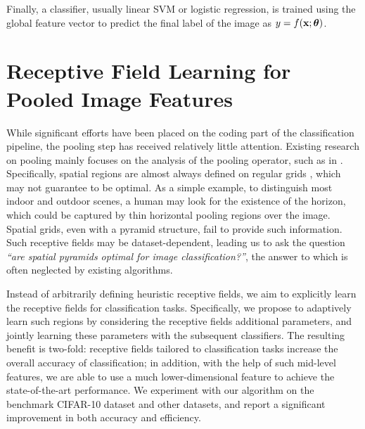 Finally, a classifier, usually linear SVM or logistic regression, is trained using the global feature vector to predict the final label of the image as $y = f(\mathbf{x};\boldsymbol{\theta})$.

\section{Receptive Field Learning for Pooled Image Features}\label{sec:grafting}
While significant efforts have been placed on the coding part of the classification pipeline, the pooling step has received relatively little attention. Existing research on pooling mainly focuses on the analysis of the pooling operator, such as in \cite{Boureau:2010wz}. Specifically, spatial regions are almost always defined on regular grids \cite{Yang:2009vb}, which may not guarantee to be optimal. As a simple example, to distinguish most indoor and outdoor scenes, a human may look for the existence of the horizon, which could be captured by thin horizontal pooling regions over the image. Spatial grids, even with a pyramid structure, fail to provide such information. Such receptive fields may be dataset-dependent, leading us to ask the question \emph{``are spatial pyramids optimal for image classification?''}, the answer to which is often neglected by existing algorithms.

Instead of arbitrarily defining heuristic receptive fields, we aim to explicitly learn the receptive fields for classification tasks. Specifically, we propose to adaptively learn such regions by considering the receptive fields additional parameters, and jointly learning these parameters with the subsequent classifiers. The resulting benefit is two-fold: receptive fields tailored to classification tasks increase the overall accuracy of classification; in addition, with the help of such mid-level features, we are able to use a much lower-dimensional feature to achieve the state-of-the-art performance. We experiment with our algorithm on the benchmark CIFAR-10 dataset and other datasets, and report a significant improvement in both accuracy and efficiency.

